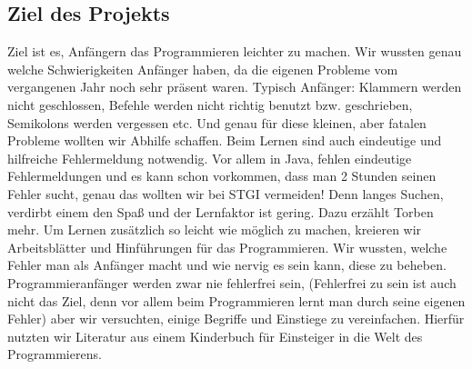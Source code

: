 \documentclass[a4paper, 12pt]{article}
\begin{document}
\subsection{Ziel des Projekts}
Ziel ist es, Anfängern das Programmieren leichter zu machen. Wir wussten genau welche Schwierigkeiten Anfänger haben, da die eigenen Probleme vom vergangenen Jahr noch sehr präsent waren. Typisch Anfänger: Klammern werden nicht geschlossen, Befehle werden nicht richtig benutzt bzw. geschrieben, Semikolons werden vergessen etc. Und genau für diese kleinen, aber fatalen Probleme wollten wir Abhilfe schaffen. Beim Lernen sind auch eindeutige und hilfreiche Fehlermeldung notwendig. Vor allem in Java, fehlen eindeutige Fehlermeldungen und es kann schon vorkommen, dass man 2 Stunden seinen Fehler sucht, genau das wollten wir bei STGI vermeiden!  Denn langes Suchen, verdirbt einem den Spaß und der Lernfaktor ist gering.  Dazu erzählt Torben mehr.
Um Lernen zusätzlich so leicht wie möglich zu machen, kreieren wir Arbeitsblätter und Hinführungen für das Programmieren. Wir wussten, welche Fehler man als Anfänger macht und wie nervig es sein kann, diese zu beheben. Programmieranfänger werden zwar nie fehlerfrei sein, (Fehlerfrei zu sein ist auch nicht das Ziel, denn vor allem beim Programmieren lernt man durch seine eigenen Fehler) aber wir versuchten, einige Begriffe und Einstiege zu vereinfachen. Hierfür nutzten wir Literatur aus einem Kinderbuch für Einsteiger in die Welt des Programmierens. 
\end{document}
